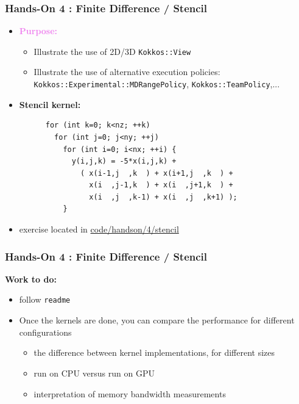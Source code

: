 \begin{frame}[fragile=singleslide]
  \frametitle{Hands-On 4 : Finite Difference / Stencil}

  \hypertarget{handson4}{}

  \begin{itemize}
  \item \textcolor{violet}{\bf Purpose:}
    \begin{itemize}
    \item Illustrate the use of 2D/3D \texttt{Kokkos::View}
    \item Illustrate the use of alternative execution policies: \texttt{Kokkos::Experimental::MDRangePolicy}, \texttt{Kokkos::TeamPolicy},...
    \end{itemize}
  \item {\bf Stencil kernel:}
    \begin{verbatim}
      for (int k=0; k<nz; ++k)
        for (int j=0; j<ny; ++j)
          for (int i=0; i<nx; ++i) {
            y(i,j,k) = -5*x(i,j,k) +
              ( x(i-1,j  ,k  ) + x(i+1,j  ,k  ) +
                x(i  ,j-1,k  ) + x(i  ,j+1,k  ) +
                x(i  ,j  ,k-1) + x(i  ,j  ,k+1) );
          }
    \end{verbatim}
  \item exercise located in \url{code/handson/4/stencil}
  \end{itemize}
  
\end{frame}

\begin{frame}[fragile=singleslide]
  \frametitle{Hands-On 4 : Finite Difference / Stencil}

  {\bf \large Work to do:}
  \begin{itemize}
  \item follow \texttt{readme}
  \item Once the kernels are done, you can compare the performance for different configurations
    \begin{itemize}
    \item the difference between kernel implementations, for different sizes
    \item run on CPU versus run on GPU
    \item interpretation of memory bandwidth measurements
    \end{itemize}
  \end{itemize}
  
\end{frame}

